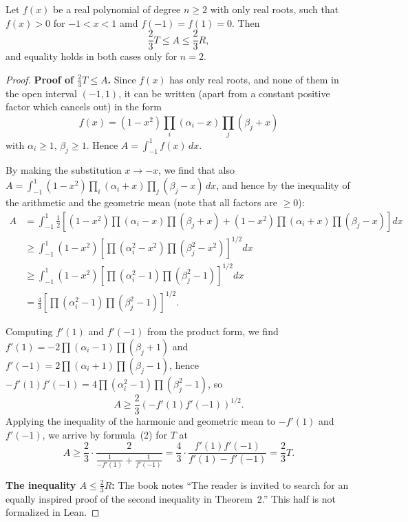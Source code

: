 \begin{theorem}
  \label{ch20theorem2}
  \leanok
  Let $f(x)$ be a real polynomial of degree $n \ge 2$ with only real
  roots, such that $f(x)> 0$ for $ -1 < x < 1$ amd $f(-1) = f(1) = 0$. Then
  \[
  \frac{2}{3}T \le A \le \frac{2}{3}R,
  \]
  and equality holds in both cases only for $n=2$.
\end{theorem}
\begin{proof}
  \leanok
  \textbf{Proof of $\frac{2}{3}T \le A$.}
  Since $f(x)$ has only real roots, and none of them in the open interval $(-1,1)$, it can be written
  (apart from a constant positive factor which cancels out) in the form
  \[
  f(x) = (1-x^2)\prod_i (\alpha_i - x)\prod_j (\beta_j + x)
  \]
  with $\alpha_i \ge 1$, $\beta_j \ge 1$. Hence $A = \int_{-1}^{1} f(x)\,dx$.

  By making the substitution $x \to -x$, we find that also
  $A = \int_{-1}^{1} (1-x^2)\prod_i(\alpha_i + x)\prod_j(\beta_j - x)\,dx$,
  and hence by the inequality of the arithmetic and the geometric mean
  (note that all factors are $\ge 0$):
  \begin{align*}
  A &= \int_{-1}^{1} \frac{1}{2}\left[(1-x^2)\prod(\alpha_i - x)\prod(\beta_j + x) + (1-x^2)\prod(\alpha_i + x)\prod(\beta_j - x)\right] dx \\
  &\ge \int_{-1}^{1} (1-x^2)\left[\prod(\alpha_i^2 - x^2)\prod(\beta_j^2 - x^2)\right]^{1/2} dx \\
  &\ge \int_{-1}^{1} (1-x^2)\left[\prod(\alpha_i^2 - 1)\prod(\beta_j^2 - 1)\right]^{1/2} dx \\
  &= \frac{4}{3}\left[\prod(\alpha_i^2 - 1)\prod(\beta_j^2 - 1)\right]^{1/2}.
  \end{align*}

  Computing $f'(1)$ and $f'(-1)$ from the product form, we find
  $f'(1) = -2\prod(\alpha_i - 1)\prod(\beta_j + 1)$ and
  $f'(-1) = 2\prod(\alpha_i + 1)\prod(\beta_j - 1)$,
  hence $-f'(1)f'(-1) = 4\prod(\alpha_i^2-1)\prod(\beta_j^2-1)$, so
  \[
  A \ge \frac{2}{3}(-f'(1)f'(-1))^{1/2}.
  \]
  Applying the inequality of the harmonic and geometric mean to $-f'(1)$ and $f'(-1)$, we arrive by
  formula~(2) for $T$ at
  \[
  A \ge \frac{2}{3}\cdot\frac{2}{\frac{1}{-f'(1)} + \frac{1}{f'(-1)}} = \frac{4}{3}\cdot\frac{f'(1)f'(-1)}{f'(1)-f'(-1)} = \frac{2}{3}T.
  \]

  \textbf{The inequality $A \le \frac{2}{3}R$:} The book notes ``The reader is invited to search for
  an equally inspired proof of the second inequality in Theorem~2.'' This half is not formalized in Lean.
\end{proof}

